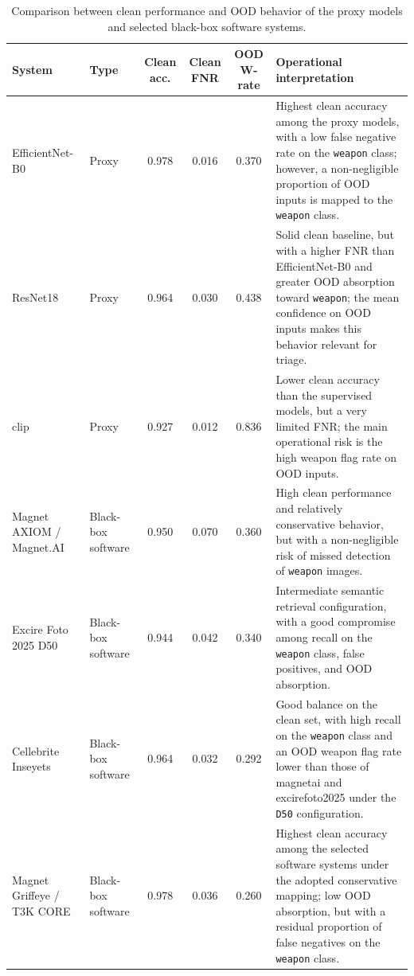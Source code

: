 \begin{table}[!htbp]
\centering
\caption{Comparison between clean performance and OOD behavior of the proxy models and selected black-box software systems.}
\label{tab:results-comparative-clean-ood}

\footnotesize
\renewcommand{\arraystretch}{1.05}
\setlength{\tabcolsep}{2.2pt}

\begin{tabularx}{\textwidth}{@{}
>{\raggedright\arraybackslash}p{2.35cm}
>{\raggedright\arraybackslash}p{1.45cm}
c c c
>{\raggedright\arraybackslash}X
@{}}
\toprule
\textbf{System} &
\textbf{Type} &
\textbf{Clean acc.} &
\textbf{Clean FNR} &
\textbf{OOD W-rate} &
\textbf{Operational interpretation} \\
\midrule

EfficientNet-B0 &
Proxy &
0.978 &
0.016 &
0.370 &
Highest clean accuracy among the proxy models, with a low false negative rate
on the \texttt{weapon} class; however, a non-negligible proportion of OOD
inputs is mapped to the \texttt{weapon} class. \\

ResNet18 &
Proxy &
0.964 &
0.030 &
0.438 &
Solid clean baseline, but with a higher FNR than EfficientNet-B0 and greater
OOD absorption toward \texttt{weapon}; the mean confidence on OOD inputs makes
this behavior relevant for triage. \\

\gls{clip} &
Proxy &
0.927 &
0.012 &
0.836 &
Lower clean accuracy than the supervised models, but a very limited FNR; the
main operational risk is the high weapon flag rate on OOD inputs. \\

Magnet AXIOM / Magnet.AI &
Black-box software &
0.950 &
0.070 &
0.360 &
High clean performance and relatively conservative behavior, but with a
non-negligible risk of missed detection of \texttt{weapon} images. \\

Excire Foto 2025 D50 &
Black-box software &
0.944 &
0.042 &
0.340 &
Intermediate semantic retrieval configuration, with a good compromise among
recall on the \texttt{weapon} class, false positives, and OOD absorption. \\

Cellebrite Inseyets &
Black-box software &
0.964 &
0.032 &
0.292 &
Good balance on the clean set, with high recall on the \texttt{weapon} class
and an OOD weapon flag rate lower than those of \gls{magnetai} and
\gls{excirefoto2025} under the \texttt{D50} configuration. \\

Magnet Griffeye / T3K CORE &
Black-box software &
0.978 &
0.036 &
0.260 &
Highest clean accuracy among the selected software systems under the adopted
conservative mapping; low OOD absorption, but with a residual proportion of
false negatives on the \texttt{weapon} class. \\

\bottomrule
\end{tabularx}
\end{table}

